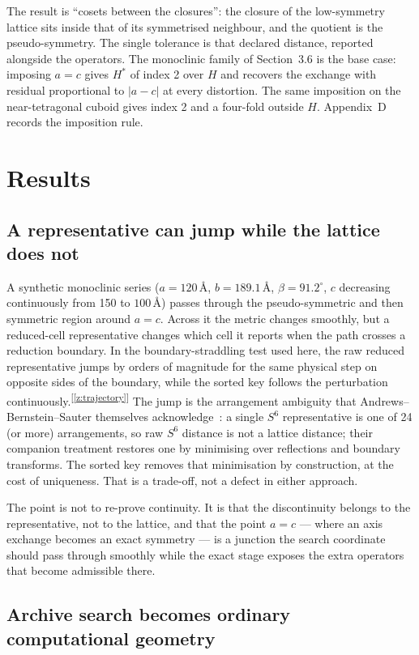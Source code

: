 \documentclass[11pt]{article}
\newcommand{\Ang}{\text{\AA}}
\newcommand{\chk}[1]{\textsuperscript{[\ref{#1}]}}
\begin{document}
The result is ``cosets between the closures'': the closure of the low-symmetry lattice sits inside that of its symmetrised neighbour, and the quotient is the pseudo-symmetry. The single tolerance is that declared distance, reported alongside the operators. The monoclinic family of Section~3.6 is the base case: imposing $a=c$ gives $H^*$ of index 2 over $H$ and recovers the exchange with residual proportional to $|a-c|$ at every distortion. The same imposition on the near-tetragonal cuboid gives index 2 and a four-fold outside $H$. Appendix~D records the imposition rule.

\section{Results}

\subsection{A representative can jump while the lattice does not}

A synthetic monoclinic series ($a=120\,\Ang$, $b=189.1\,\Ang$, $\beta=91.2^\circ$, $c$ decreasing continuously from 150 to $100\,\Ang$) passes through the pseudo-symmetric and then symmetric region around $a=c$. Across it the metric changes smoothly, but a reduced-cell representative changes which cell it reports when the path crosses a reduction boundary. In the boundary-straddling test used here, the raw reduced representative jumps by orders of magnitude for the same physical step on opposite sides of the boundary, while the sorted key follows the perturbation continuously.\chk{z:trajectory} The jump is the arrangement ambiguity that Andrews--Bernstein--Sauter themselves acknowledge~\cite{abs2019}: a single $S^6$ representative is one of 24 (or more) arrangements, so raw $S^6$ distance is not a lattice distance; their companion treatment restores one by minimising over reflections and boundary transforms. The sorted key removes that minimisation by construction, at the cost of uniqueness. That is a trade-off, not a defect in either approach.

The point is not to re-prove continuity. It is that the discontinuity belongs to the representative, not to the lattice, and that the point $a=c$ --- where an axis exchange becomes an exact symmetry --- is a junction the search coordinate should pass through smoothly while the exact stage exposes the extra operators that become admissible there.

\subsection{Archive search becomes ordinary computational geometry}
\end{document}
